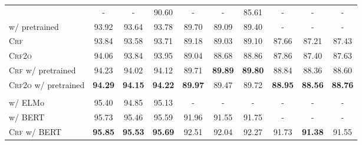 \begin{table*}[tb]
\begin{tabularx}{\textwidth}{lccccccccc}
    \citet{vilares-etal-2019-better}                 & -                        & -                          & 90.60                    & -                        & -                        & 85.61                    & -              & -              & -              \\
    \citet{zhou-zhao-2019-head} w/ pretrained        & 93.92                    & 93.64                      & 93.78                    & 89.70                    & 89.09                    & 89.40                    & -              & -              & -              \\[3pt]
    \textsc{Crf}                                     & 93.84                    & 93.58                      & 93.71                    & 89.18                    & 89.03                    & 89.10                    & 87.66          & 87.21          & 87.43          \\
    \textsc{Crf2o}                                   & 94.06                    & 93.84                      & 93.95                    & 89.04                    & 88.68                    & 88.86                    & 87.86          & 87.40          & 87.63          \\
    \textsc{Crf} w/ pretrained                       & 94.23                    & 94.02                      & 94.12                    & 89.71                    & \textbf{89.89}           & \textbf{89.80}           & 88.84          & 88.36          & 88.60          \\
    \textsc{Crf2o} w/ pretrained                     & \textbf{94.29}           & \textbf{94.15}             & \textbf{94.22}           & \textbf{89.97}           & 89.47                    & 89.72                    & \textbf{88.95} & \textbf{88.56} & \textbf{88.76} \\[1pt]
    \midrule
    \\[-20pt]
    \citet{kitaev-klein-2018-constituency} w/ ELMo   & 95.40                    & 94.85                      & 95.13                    & -                        & -                        & -                        & -              & -              & -              \\
    \citet{kitaev-etal-2019-multilingual} w/ BERT    & 95.73                    & 95.46                      & 95.59                    & 91.96                    & 91.55                    & 91.75                    & -              & -              & -              \\[3pt]
    \textsc{Crf} w/ BERT                             & \textbf{95.85}           & \textbf{95.53}             & \textbf{95.69}           & 92.51                    & 92.04                    & 92.27                    & 91.73          & \textbf{91.38} & 91.55          \\

\end{tabularx}
\end{table*}
